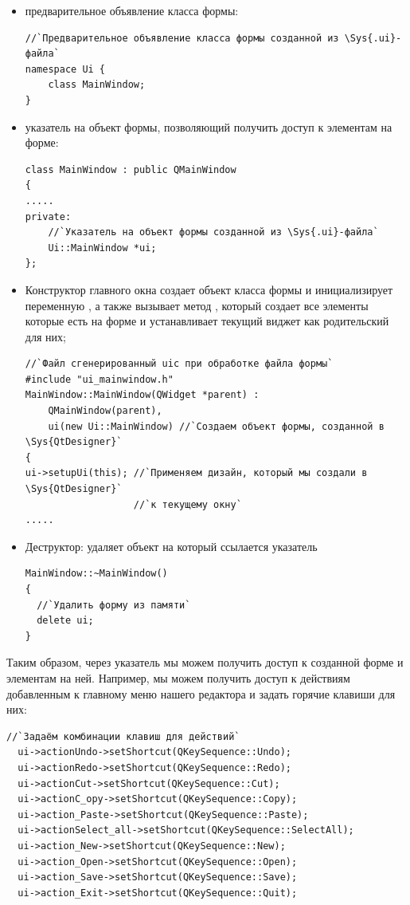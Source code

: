 \begin{itemize}
\item предварительное объявление класса формы: 
\begin{lstlisting}
//`Предварительное объявление класса формы созданной из \Sys{.ui}-файла`
namespace Ui {
    class MainWindow;
}
\end{lstlisting}

\item указатель на объект формы, позволяющий получить доступ к элементам на форме: 
\begin{lstlisting}
class MainWindow : public QMainWindow
{
.....
private:
    //`Указатель на объект формы созданной из \Sys{.ui}-файла` 
    Ui::MainWindow *ui;    
};
\end{lstlisting}

\item Конструктор главного окна создает объект класса формы и инициализирует переменную , 
а также вызывает метод , который создает все элементы которые есть на форме и 
устанавливает текущий виджет как родительский для них; 
\begin{lstlisting}
//`Файл сгенерированный uic при обработке файла формы`
#include "ui_mainwindow.h"
MainWindow::MainWindow(QWidget *parent) :
    QMainWindow(parent),
    ui(new Ui::MainWindow) //`Создаем объект формы, созданной в \Sys{QtDesigner}` 
{    
ui->setupUi(this); //`Применяем дизайн, который мы создали в \Sys{QtDesigner}`
                   //`к текущему окну` 
.....
\end{lstlisting}

\item Деструктор: удаляет объект на который ссылается указатель  
\begin{lstlisting}
MainWindow::~MainWindow()
{
  //`Удалить форму из памяти`
  delete ui;
}
\end{lstlisting}
\end{itemize}

Таким образом, через указатель  мы можем получить доступ к созданной форме и элементам на ней. 
Например, мы можем
получить доступ к действиям добавленным к главному меню нашего редактора и задать 
горячие клавиши для них:
\begin{lstlisting} 
//`Задаём комбинации клавиш для действий`
  ui->actionUndo->setShortcut(QKeySequence::Undo);
  ui->actionRedo->setShortcut(QKeySequence::Redo);
  ui->actionCut->setShortcut(QKeySequence::Cut);
  ui->actionC_opy->setShortcut(QKeySequence::Copy);
  ui->action_Paste->setShortcut(QKeySequence::Paste);
  ui->actionSelect_all->setShortcut(QKeySequence::SelectAll);
  ui->action_New->setShortcut(QKeySequence::New);
  ui->action_Open->setShortcut(QKeySequence::Open);
  ui->action_Save->setShortcut(QKeySequence::Save);
  ui->action_Exit->setShortcut(QKeySequence::Quit);
\end{lstlisting}

